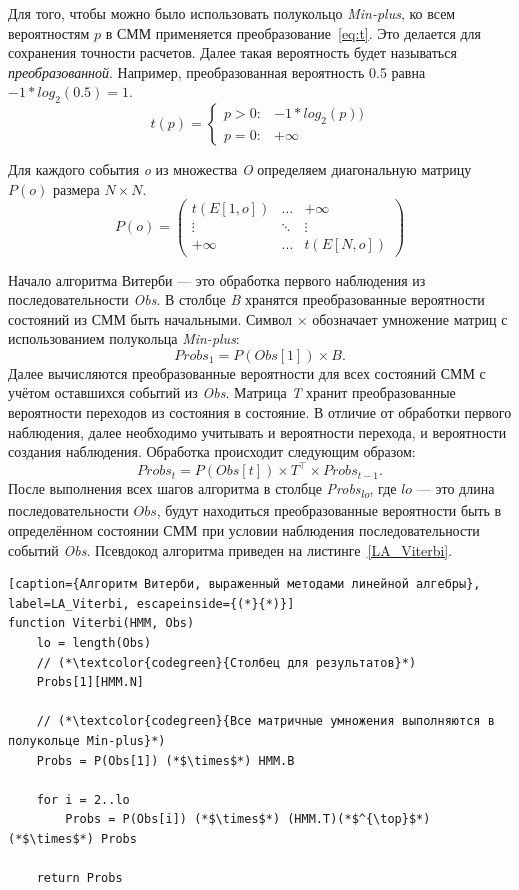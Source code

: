Для того, чтобы можно было использовать полукольцо \emph{Min-plus}, 
ко всем вероятностям $p$ в СММ применяется 
преобразование~\ref{eq:t}.
Это делается для сохранения точности расчетов.
Далее такая вероятность будет называться \emph{преобразованной}.
Например, преобразованная вероятность 0.5
равна $-1 * log_2(0.5) = 1$.
\begin{equation}
t(p) =
	\begin{cases}
	p > 0: & -1 * log_{2}(p))\\
	p = 0: & +\infty
	\end{cases}       
  \label{eq:t}
\end{equation}

Для каждого события \emph{o} из множества \emph{O} 
определяем диагональную матрицу $P(o)$ размера $N \times N$.
\[
  P(o) =
  \begin{pmatrix}
    t(E[1,o]) & \hdots & +\infty \\
    \vdots & \ddots & \vdots\\
    +\infty & \hdots & t(E[N,o])
  \end{pmatrix}
\]

Начало алгоритма Витерби --- это обработка первого наблюдения 
из последовательности \emph{Obs}.
В столбце \emph{B} хранятся преобразованные вероятности 
состояний из СММ быть начальными.
Символ $\times$ обозначает умножение матриц с использованием 
полукольца \emph{Min-plus}:
\[Probs_{1} = P(Obs[1]) \times B.\]
Далее вычисляются преобразованные вероятности для всех 
состояний СММ с учётом ос\-тавшихся событий из \emph{Obs}.
Матрица \emph{T} хранит преобразованные вероятности 
переходов из состояния в состояние.
В отличие от обработки первого наблюдения, далее необходимо 
учитывать и вероятности перехода, и вероятности создания 
наблюдения.
Обработка происходит следующим образом:
\[Probs_{t} = P(Obs[t]) \times T^{\top} \times Probs_{t - 1}.\]
После выполнения всех шагов алгоритма в столбце 
\emph{Probs\textsubscript{lo}}, где $lo$ --- это длина 
последовательности $Obs$, будут находиться преобразованные 
вероятности быть в определённом состоянии СММ при условии 
наблюдения последовательности событий \emph{Obs}.
Псевдокод алгоритма приведен на листинге~\ref{LA_Viterbi}.
\begin{lstlisting}[caption={Алгоритм Витерби, выраженный методами линейной алгебры}, label=LA_Viterbi, escapeinside={(*}{*)}]
function Viterbi(HMM, Obs)
	lo = length(Obs)
	// (*\textcolor{codegreen}{Столбец для результатов}*)
	Probs[1][HMM.N]

	// (*\textcolor{codegreen}{Все матричные умножения выполняются в полукольце Min-plus}*)
	Probs = P(Obs[1]) (*$\times$*) HMM.B
	
	for i = 2..lo
		Probs = P(Obs[i]) (*$\times$*) (HMM.T)(*$^{\top}$*) (*$\times$*) Probs
		
	return Probs
\end{lstlisting}


